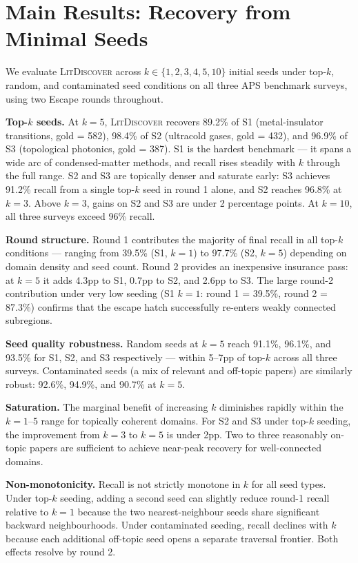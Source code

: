 \documentclass[conference]{IEEEtran}
\newcommand{\ldiscover}{\textsc{LitDiscover}}
\begin{document}
\section{Main Results: Recovery from Minimal Seeds}

We evaluate \ldiscover{} across $k \in \{1,2,3,4,5,10\}$ initial seeds under top-$k$,
random, and contaminated seed conditions on all three APS benchmark surveys, using two
Escape rounds throughout.

\textbf{Top-$k$ seeds.} At $k = 5$, \ldiscover{} recovers 89.2\% of S1 (metal-insulator
transitions, gold = 582), 98.4\% of S2 (ultracold gases, gold = 432), and 96.9\% of S3
(topological photonics, gold = 387). S1 is the hardest benchmark --- it spans a wide arc of
condensed-matter methods, and recall rises steadily with $k$ through the full range. S2 and
S3 are topically denser and saturate early: S3 achieves 91.2\% recall from a single top-$k$
seed in round 1 alone, and S2 reaches 96.8\% at $k = 3$. Above $k = 3$, gains on S2 and S3
are under 2 percentage points. At $k = 10$, all three surveys exceed 96\% recall.

\textbf{Round structure.} Round 1 contributes the majority of final recall in all top-$k$
conditions --- ranging from 39.5\% (S1, $k = 1$) to 97.7\% (S2, $k = 5$) depending on
domain density and seed count. Round 2 provides an inexpensive insurance pass: at $k = 5$
it adds 4.3pp to S1, 0.7pp to S2, and 2.6pp to S3. The large round-2 contribution under
very low seeding (S1 $k = 1$: round 1 = 39.5\%, round 2 = 87.3\%) confirms that the escape
hatch successfully re-enters weakly connected subregions.

\textbf{Seed quality robustness.} Random seeds at $k = 5$ reach 91.1\%, 96.1\%, and 93.5\%
for S1, S2, and S3 respectively --- within 5--7pp of top-$k$ across all three surveys.
Contaminated seeds (a mix of relevant and off-topic papers) are similarly robust: 92.6\%,
94.9\%, and 90.7\% at $k = 5$.

\textbf{Saturation.} The marginal benefit of increasing $k$ diminishes rapidly within the
$k = 1$--$5$ range for topically coherent domains. For S2 and S3 under top-$k$ seeding,
the improvement from $k = 3$ to $k = 5$ is under 2pp. Two to three reasonably on-topic
papers are sufficient to achieve near-peak recovery for well-connected domains.

\textbf{Non-monotonicity.} Recall is not strictly monotone in $k$ for all seed types. Under
top-$k$ seeding, adding a second seed can slightly reduce round-1 recall relative to $k = 1$
because the two nearest-neighbour seeds share significant backward neighbourhoods. Under
contaminated seeding, recall declines with $k$ because each additional off-topic seed opens
a separate traversal frontier. Both effects resolve by round 2.
\end{document}
